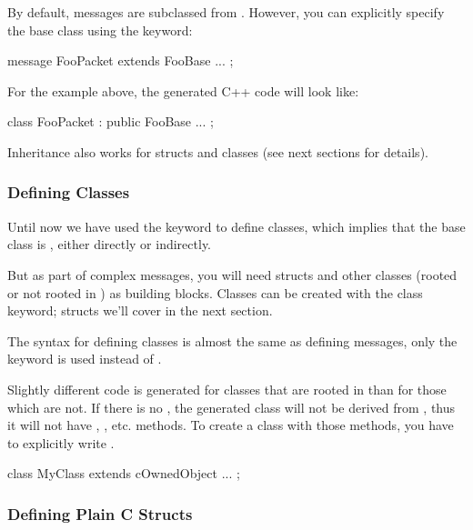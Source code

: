 By default, messages are subclassed from . However, you can
explicitly specify the base class using the  keyword:

\begin{msg}
message FooPacket extends FooBase
{
    ...
};
\end{msg}

For the example above, the generated C++ code will look like:

\begin{cpp}
class FooPacket : public FooBase { ... };
\end{cpp}

Inheritance also works for structs and classes (see next sections
for details).



\subsubsection{Defining Classes}

Until now we have used the  keyword to define classes, which
implies that the base class is , either directly or indirectly.

But as part of complex messages, you will need structs and other classes
(rooted or not rooted in ) as building blocks.
Classes can be created with the  class keyword;
structs we'll cover in the next section.

The syntax for defining classes is almost the same as defining messages,
only the  keyword is used instead of .

Slightly different code is generated for classes that are rooted in
 than for those which are not.
If there is no , the generated class will not be
derived from , thus it will not have ,
, etc. methods.
To create a class with those methods, you have to explicitly write
.

\begin{msg}
class MyClass extends cOwnedObject
{
    ...
};
\end{msg}



\subsubsection{Defining Plain C Structs}

